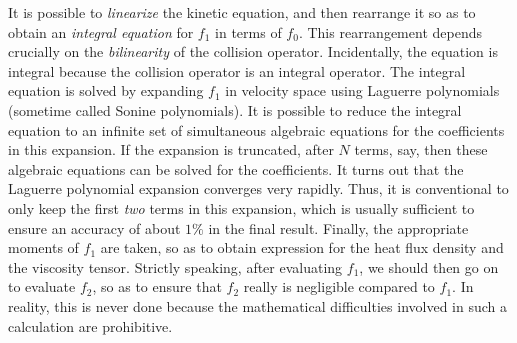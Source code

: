 It is possible to {\em linearize}\/ the kinetic equation, and then rearrange
it so as to obtain an {\em integral equation}\/ for $f_1$ in terms of $f_0$.
This rearrangement depends crucially on the {\em bilinearity}\/ of the collision
operator.
Incidentally, the equation is integral because the collision operator is an integral
operator. The integral equation is solved by expanding $f_1$ in velocity space
using Laguerre polynomials (sometime called Sonine polynomials). It is
possible to reduce the integral equation to an infinite  set of simultaneous
algebraic equations for the coefficients in this expansion. If the expansion
is truncated, after $N$ terms, say, then these algebraic equations can be solved for
the coefficients. It turns out that the Laguerre polynomial expansion
converges very rapidly. Thus, it is conventional to only keep the first {\em two}\/
terms in this expansion, which is usually sufficient to ensure an accuracy of
about $1\%$ in the final result. Finally, the appropriate moments
of $f_1$ are taken, so as to obtain expression for the heat flux density
and the viscosity
tensor. Strictly speaking, after evaluating $f_1$, we should then go on to
evaluate $f_2$, so as to ensure that $f_2$ really is negligible compared to $f_1$.
In reality, this is never done because the mathematical difficulties involved
in such a calculation are prohibitive.

